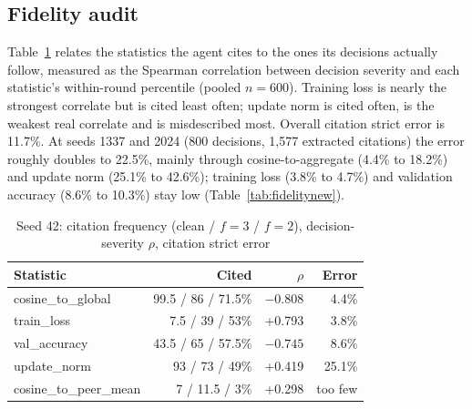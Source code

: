 \subsection{Fidelity audit}
Table~\ref{tab:fidelity42} relates the statistics the agent cites to the ones its
decisions actually follow, measured as the Spearman correlation between decision
severity and each statistic's within-round percentile (pooled $n=600$). Training loss is %
nearly the strongest correlate but is cited least often; update norm is cited often, is
the weakest real correlate and is misdescribed most. Overall citation strict error is
11.7\%. At seeds 1337 and 2024 (800 decisions, 1,577 extracted citations) the error %
roughly doubles to 22.5\%, mainly through cosine-to-aggregate (4.4\% to 18.2\%) and %
update norm (25.1\% to 42.6\%); training loss (3.8\% to 4.7\%) and validation accuracy %
(8.6\% to 10.3\%) stay low (Table~\ref{tab:fidelitynew}). %

\begin{table}[h]
\centering
\caption{Seed 42: citation frequency (clean / $f=3$ / $f=2$), decision-severity $\rho$, citation strict error} %
\label{tab:fidelity42}
\footnotesize
\setlength{\tabcolsep}{2.5pt}
\begin{tabular}{@{}lrrr@{}}
\toprule
Statistic & Cited & $\rho$ & Error\\
\midrule
cosine\_to\_global & 99.5 / 86 / 71.5\% & $-0.808$ & 4.4\%\\ %
train\_loss & 7.5 / 39 / 53\% & +0.793 & 3.8\%\\ %
val\_accuracy & 43.5 / 65 / 57.5\% & $-0.745$ & 8.6\%\\ %
update\_norm & 93 / 73 / 49\% & +0.419 & 25.1\%\\ %
cosine\_to\_peer\_mean & 7 / 11.5 / 3\% & +0.298 & too few\\ %
\bottomrule
\end{tabular}
\end{table}

